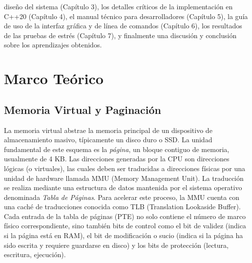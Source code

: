 \documentclass[12pt,letterpaper]{article}
\begin{document}
diseño del sistema (Capítulo 3), los detalles críticos de la implementación en C++20 (Capítulo 4), el manual técnico para desarrolladores (Capítulo 5), la guía de uso de la interfaz gráfica y de línea de comandos (Capítulo 6), los resultados de las pruebas de estrés (Capítulo 7), y finalmente una discusión y conclusión sobre los aprendizajes obtenidos. \newpage
\section{Marco Teórico}

\subsection{Memoria Virtual y Paginación}

La memoria virtual abstrae la memoria principal de un dispositivo de almacenamiento masivo, típicamente un disco duro o SSD. La unidad fundamental de este esquema es la \textit{página}, un bloque contiguo de memoria, usualmente de 4 KB. Las direcciones generadas por la CPU son direcciones lógicas (o virtuales), las cuales deben ser traducidas a direcciones físicas por una unidad de hardware llamada MMU (Memory Management Unit). La traducción se realiza mediante una estructura de datos mantenida por el sistema operativo denominada \textit{Tabla de Páginas}. Para acelerar este proceso, la MMU cuenta con una caché de traducciones conocida como TLB (Translation Lookaside Buffer). Cada entrada de la tabla de páginas (PTE) no solo contiene el número de marco físico correspondiente, sino también bits de control como el bit de validez (indica si la página está en RAM), el bit de modificación o sucio (indica si la página ha sido escrita y requiere guardarse en disco) y los bits de protección (lectura, escritura, ejecución). \begin{figure}[H]
\centering
{}
\end{figure}
\end{document}
